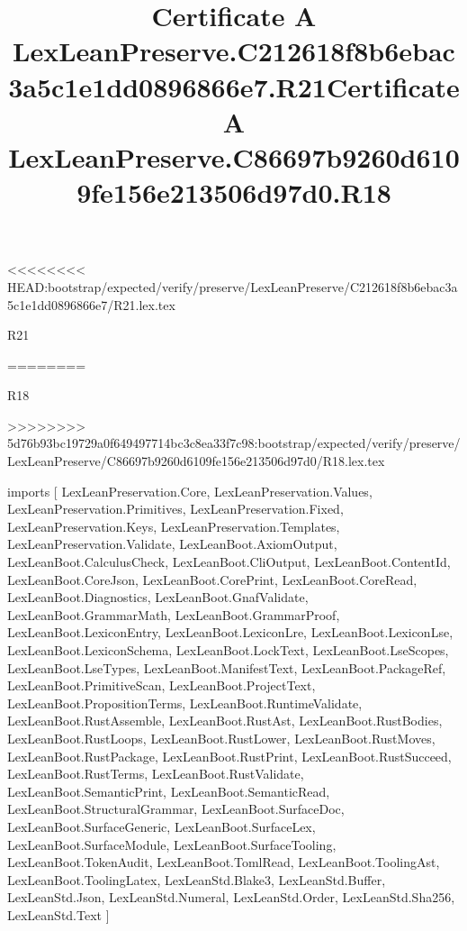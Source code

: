 <<<<<<<< HEAD:bootstrap/expected/verify/preserve/LexLeanPreserve/C212618f8b6ebac3a5c1e1dd0896866e7/R21.lex.tex
\begin{lexlean}{R21}
\title{Certificate A LexLeanPreserve.C212618f8b6ebac3a5c1e1dd0896866e7.R21}
========
\begin{lexlean}{R18}
\title{Certificate A LexLeanPreserve.C86697b9260d6109fe156e213506d97d0.R18}
>>>>>>>> 5d76b93bc19729a0f649497714bc3c8ea33f7c98:bootstrap/expected/verify/preserve/LexLeanPreserve/C86697b9260d6109fe156e213506d97d0/R18.lex.tex
\begin{coremodule}
imports [
  LexLeanPreservation.Core,
  LexLeanPreservation.Values,
  LexLeanPreservation.Primitives,
  LexLeanPreservation.Fixed,
  LexLeanPreservation.Keys,
  LexLeanPreservation.Templates,
  LexLeanPreservation.Validate,
  LexLeanBoot.AxiomOutput,
  LexLeanBoot.CalculusCheck,
  LexLeanBoot.CliOutput,
  LexLeanBoot.ContentId,
  LexLeanBoot.CoreJson,
  LexLeanBoot.CorePrint,
  LexLeanBoot.CoreRead,
  LexLeanBoot.Diagnostics,
  LexLeanBoot.GnafValidate,
  LexLeanBoot.GrammarMath,
  LexLeanBoot.GrammarProof,
  LexLeanBoot.LexiconEntry,
  LexLeanBoot.LexiconLre,
  LexLeanBoot.LexiconLse,
  LexLeanBoot.LexiconSchema,
  LexLeanBoot.LockText,
  LexLeanBoot.LseScopes,
  LexLeanBoot.LseTypes,
  LexLeanBoot.ManifestText,
  LexLeanBoot.PackageRef,
  LexLeanBoot.PrimitiveScan,
  LexLeanBoot.ProjectText,
  LexLeanBoot.PropositionTerms,
  LexLeanBoot.RuntimeValidate,
  LexLeanBoot.RustAssemble,
  LexLeanBoot.RustAst,
  LexLeanBoot.RustBodies,
  LexLeanBoot.RustLoops,
  LexLeanBoot.RustLower,
  LexLeanBoot.RustMoves,
  LexLeanBoot.RustPackage,
  LexLeanBoot.RustPrint,
  LexLeanBoot.RustSucceed,
  LexLeanBoot.RustTerms,
  LexLeanBoot.RustValidate,
  LexLeanBoot.SemanticPrint,
  LexLeanBoot.SemanticRead,
  LexLeanBoot.StructuralGrammar,
  LexLeanBoot.SurfaceDoc,
  LexLeanBoot.SurfaceGeneric,
  LexLeanBoot.SurfaceLex,
  LexLeanBoot.SurfaceModule,
  LexLeanBoot.SurfaceTooling,
  LexLeanBoot.TokenAudit,
  LexLeanBoot.TomlRead,
  LexLeanBoot.ToolingAst,
  LexLeanBoot.ToolingLatex,
  LexLeanStd.Blake3,
  LexLeanStd.Buffer,
  LexLeanStd.Json,
  LexLeanStd.Numeral,
  LexLeanStd.Order,
  LexLeanStd.Sha256,
  LexLeanStd.Text
]


\end{coremodule}
\end{lexlean}
\end{lexlean}
